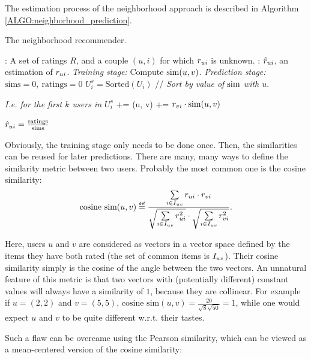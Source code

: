 The estimation process of the neighborhood approach is described in Algorithm
\ref{ALGO:neighborhood_prediction}.

\begin{algorithm}[!ht]
 \caption{The neighborhood recommender.}
       \label{ALGO:neighborhood_prediction}
       \begin{algorithmic}

         : A set of ratings $R$, and a couple $(u, i)$ for
         which $r_{ui}$ is  unknown.
         : $\hat{r}_{ui}$, an estimation of $r_{ui}$.
         \STATE \textit{Training stage:}
         \STATE Compute $\text{sim}(u, v)$.
	    \ENDFOR
       \STATE \textit{Prediction stage:}
         \STATE $\text{sims} = 0, ~ \text{ratings} = 0$
         \STATE $U_i^s = \text{Sorted}(U_i)$  // \textit{Sort by value of
         $\text{sim}$ with $u$}.

         \STATE \textit{I.e. for the first $k$ users in $U_i^s$}
         \STATE {} += \ssim(u, v)
         \STATE {} += $r_{vi} \cdot \text{sim}(u, v)$
         \ENDFOR

         \STATE $\hat{r}_{ui} = \frac{\text{ratings}}{\text{sims}}$
\end{algorithmic}
\end{algorithm}

Obviously, the training stage only needs to be done once. Then, the
similarities can be reused for later predictions.  There are many, many ways to
define the similarity metric between two users.  Probably the most common one
is the cosine similarity:
$$
\text{cosine sim}(u, v) \eqdef \frac{ \sum\limits_{i \in \Iuv} \rui \cdot \rvi}
{\sqrt{\sum\limits_{i \in \Iuv} \rui^2} \cdot \sqrt{\sum\limits_{i \in \Iuv}
\rvi^2}}.
$$

Here, users $u$ and $v$ are considered as vectors in a vector space defined by
the items they have both rated (the set of common items is $I_{uv}$). Their
cosine similarity simply is the cosine of the angle between the two vectors. An
unnatural feature of this metric is that two vectors with (potentially
different) constant values will always have a similarity of $1$, because they
are collinear. For example if $u = (2, 2)$ and $v = (5, 5)$, $\text{cosine
sim}(u, v) = \frac{20}{\sqrt{8}\sqrt{50}} = 1$, while one would expect $u$ and
$v$ to be quite different w.r.t. their tastes.

Such a flaw can be overcame using the Pearson similarity, which can be viewed as
a mean-centered version of the cosine similarity:

